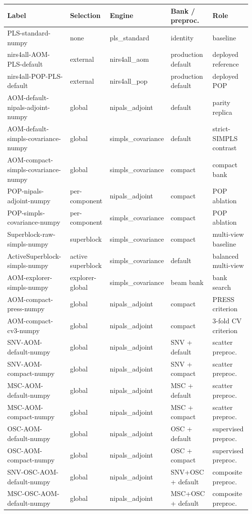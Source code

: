 \begin{tabular}{lllll}
\toprule
Label & Selection & Engine & Bank / preproc. & Role \\
\midrule
PLS-standard-numpy & none & pls\_standard & identity & baseline \\
nirs4all-AOM-PLS-default & external & nirs4all\_aom & production default & deployed reference \\
nirs4all-POP-PLS-default & external & nirs4all\_pop & production default & deployed POP \\
AOM-default-nipals-adjoint-numpy & global & nipals\_adjoint & default & parity replica \\
AOM-default-simpls-covariance-numpy & global & simpls\_covariance & default & strict-SIMPLS contrast \\
AOM-compact-simpls-covariance-numpy & global & simpls\_covariance & compact & compact bank \\
POP-nipals-adjoint-numpy & per-component & nipals\_adjoint & compact & POP ablation \\
POP-simpls-covariance-numpy & per-component & simpls\_covariance & compact & POP ablation \\
Superblock-raw-simpls-numpy & superblock & simpls\_covariance & compact & multi-view baseline \\
ActiveSuperblock-simpls-numpy & active superblock & simpls\_covariance & default & balanced multi-view \\
AOM-explorer-simpls-numpy & explorer-global & simpls\_covariance & beam bank & bank search \\
AOM-compact-press-numpy & global & nipals\_adjoint & compact & PRESS criterion \\
AOM-compact-cv3-numpy & global & nipals\_adjoint & compact & 3-fold CV criterion \\
SNV-AOM-default-numpy & global & nipals\_adjoint & SNV + default & scatter preproc. \\
SNV-AOM-compact-numpy & global & nipals\_adjoint & SNV + compact & scatter preproc. \\
MSC-AOM-default-numpy & global & nipals\_adjoint & MSC + default & scatter preproc. \\
MSC-AOM-compact-numpy & global & nipals\_adjoint & MSC + compact & scatter preproc. \\
OSC-AOM-default-numpy & global & nipals\_adjoint & OSC + default & supervised preproc. \\
OSC-AOM-compact-numpy & global & nipals\_adjoint & OSC + compact & supervised preproc. \\
SNV-OSC-AOM-default-numpy & global & nipals\_adjoint & SNV+OSC + default & composite preproc. \\
MSC-OSC-AOM-default-numpy & global & nipals\_adjoint & MSC+OSC + default & composite preproc. \\
\bottomrule
\end{tabular}
